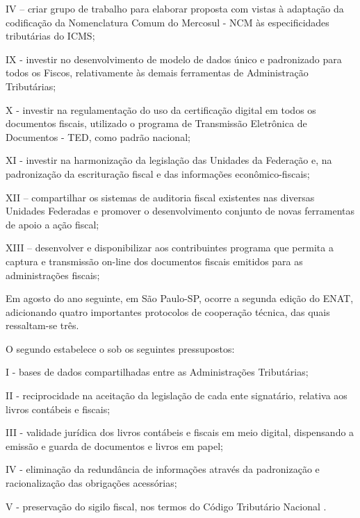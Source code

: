 \begin{citacao}
IV – criar grupo de trabalho para elaborar proposta com vistas à adaptação da codificação
da Nomenclatura Comum do Mercosul - NCM  às especificidades tributárias do ICMS;

IX - investir no desenvolvimento de modelo de dados único e padronizado para todos os
Fiscos, relativamente às demais ferramentas de Administração Tributárias;

X - investir na regulamentação do uso da certificação digital em todos os documentos
fiscais, utilizado o programa de Transmissão Eletrônica de Documentos - TED, como padrão
nacional;

XI - investir na harmonização da legislação das Unidades da Federação e, na
padronização da escrituração fiscal e das informações econômico-fiscais;

XII – compartilhar os sistemas de auditoria fiscal existentes nas diversas Unidades
Federadas e promover o desenvolvimento conjunto de novas ferramentas de apoio a ação fiscal;

XIII – desenvolver e disponibilizar aos contribuintes programa que permita a captura e
transmissão on-line dos documentos fiscais emitidos para as administrações fiscais; 
\end{citacao}

Em agosto do ano seguinte, em São Paulo-SP, ocorre a segunda edição do ENAT, adicionando quatro importantes protocolos de cooperação técnica, das quais ressaltam-se três.

O segundo estabelece o  sob os seguintes pressupostos:

\begin{citacao}
I - bases de dados compartilhadas entre as Administrações Tributárias;

II - reciprocidade na aceitação da legislação de cada ente signatário, relativa aos livros
contábeis e fiscais;

III - validade jurídica dos livros contábeis e fiscais em meio digital, dispensando a
emissão e guarda de documentos e livros em papel;

IV - eliminação da redundância de informações através da padronização e racionalização
das obrigações acessórias;

V - preservação do sigilo fiscal, nos termos do Código Tributário Nacional \cite{enat:2005:protocolo2}. 
\end{citacao}


